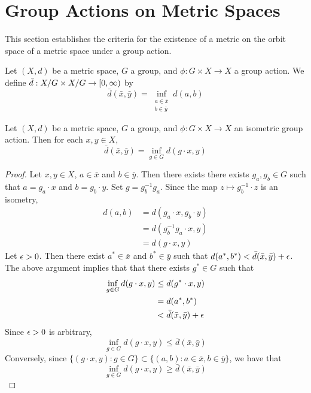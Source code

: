 \documentclass{book}
\begin{document}
	
	
	
	
	
	
	\newpage
	\section{Group Actions on Metric Spaces}
	
	\begin{note}
	This section establishes the criteria for the existence of a metric on the orbit space of a metric space under a group action. 
	\end{note}
	
	\begin{defn} \ld{}
	Let $(X, d)$ be a metric space, $G$ a group, and $\phi: G \times X \rightarrow X$ a group action. We define 
	$\bar{d}: X/G \times X / G \rightarrow [0,\infty)$ by 
	$$\bar{d}(\bar{x}, \bar{y}) = \inf_{\substack{a \in \bar{x} \\ b \in \bar{y}}} d(a,b) $$
	\end{defn}
	
	\begin{ex} \lex{}
	Let $(X, d)$ be a metric space, $G$ a group, and $\phi: G \times X \rightarrow X$ an isometric group action. Then for each $x, y \in X$, $$\bar{d}(\bar{x}, \bar{y}) = \inf_{g \in G} d(g \cdot x, y)$$
	\end{ex}
	
	\begin{proof}
	Let $x, y \in X$, $a \in \bar{x}$ and $b \in \bar{y}$. Then there exists there exists $g_a, g_b \in G$ such that $a = g_a \cdot x$ and $b = g_b \cdot y$. Set $g = g_b^{-1}g_a$. Since the map $z \mapsto g_b^{-1} \cdot z$ is an isometry, 
	\begin{align*}
	d(a,b) 
	&= d(g_a \cdot x, g_b \cdot y) \\
	&= d(g_b^{-1}g_a \cdot x, y)\\
	&= d(g\cdot x, y)
	\end{align*}
	Let $\epsilon >0$. Then there exist $a^* \in \bar{x}$ and $b^* \in \bar{y}$ such that $d(a^*,b^*) < \bar{d}(\bar{x},\bar{y}) + \epsilon$. The above argument implies that that there exists $g^* \in G$ such that 
	\begin{align*} 
	\inf_{g \in G} d(g \cdot x, y) 
	& \leq d(g^* \cdot x, y) \\
	&= d(a^*, b^*) \\
	& < \bar{d}(\bar{x}, \bar{y}) + \epsilon
\end{align*}	 
	Since $\epsilon >0$ is arbitrary, $$\inf_{g \in G} d(g \cdot x, y) \leq \bar{d}(\bar{x}, \bar{y})$$
	Conversely, since $\{(g \cdot x, y): g \in G\} \subset \{(a,b): a \in \bar{x}, b \in \bar{y}\}$, we have that 
	$$\inf_{g \in G} d(g \cdot x, y) \geq \bar{d}(\bar{x}, \bar{y})$$ 
	\end{proof}
	
\end{document}
